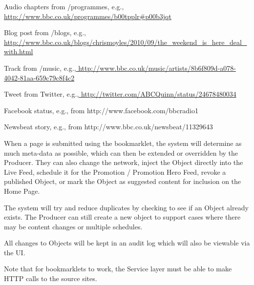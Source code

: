 \documentclass[a4paper, 11pt]{scrreprt}
\begin{document}
\begin{tystrul}
\item Audio chapters from /programmes, e.g.,\href{http://www.google.com/url?q=http%3A%2F%2Fwww.bbc.co.uk%2Fprogrammes%2Fb00tpplr%23p00b3jqt&sa=D&sntz=1&usg=AFQjCNHlgFkSx8QRxDV1rZy7o8bYYvBzEA}{ http://www.bbc.co.uk/programmes/b00tpplr\#p00b3jqt}

\item Blog post from /blogs, e.g.,\href{http://www.google.com/url?q=http%3A%2F%2Fwww.bbc.co.uk%2Fblogs%2Fchrismoyles%2F2010%2F09%2Fthe_weekend_is_here_deal_with.html&sa=D&sntz=1&usg=AFQjCNEkw9ICNcJJKKIt09afTCHE4fueBA}{ http://www.bbc.co.uk/blogs/chrismoyles/2010/09/the\_weekend\_is\_here\_deal\_with.html}

\item Track from /music, e.g.,\href{http://www.google.com/url?q=http%3A%2F%2Fwww.bbc.co.uk%2Fmusic%2Fartists%2F8b6f809d-a078-4042-81aa-659c79c8f4c2&sa=D&sntz=1&usg=AFQjCNGNSuAetrJxBj_P8KV72ev4D-4qzQ}{ http://www.bbc.co.uk/music/artists/8b6f809d-a078-4042-81aa-659c79c8f4c2}

\item Tweet from Twitter, e.g.,\href{http://www.google.com/url?q=http%3A%2F%2Ftwitter.com%2FABCQuinn%2Fstatus%2F24678480034&sa=D&sntz=1&usg=AFQjCNFZrjtDb8Ftc1_mPmyG-wp6JZygDw}{ http://twitter.com/ABCQuinn/status/24678480034}

\item Facebook status, e.g., from http://www.facebook.com/bbcradio1

\item Newsbeat story, e.g., from http://www.bbc.co.uk/newsbeat/11329643

\end{tystrul}

When a page is submitted using the bookmarklet, the system will determine as much meta-data as possible, which can then be extended or overridden by the Producer. They can also change the network, inject the Object directly into the Live Feed, schedule it for the Promotion / Promotion Hero Feed, revoke a published Object, or mark the Object as suggested content for inclusion on the Home Page. 

The system will try and reduce duplicates by checking to see if an Object already exists. The Producer can still create a new object to support cases where there may be content changes or multiple schedules.

All changes to Objects will be kept in an audit log which will also be viewable via the UI.

Note that for bookmarklets to work, the Service layer must be able to make HTTP calls to the source sites.
\end{document}
